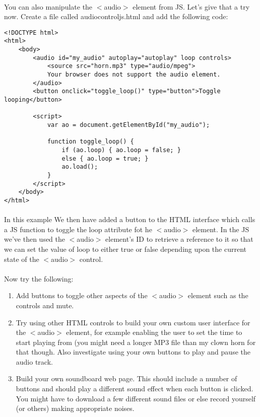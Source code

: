 \documentclass[10pt, a4paper]{article}
\begin{document}
\paragraph{} You can also manipulate the $<$audio$>$ element from JS. Let's give that a try now. Create a file called audiocontroljs.html and add the following code:

\begin{lstlisting}
<!DOCTYPE html>
<html>
    <body>
        <audio id="my_audio" autoplay="autoplay" loop controls>
            <source src="horn.mp3" type="audio/mpeg">
            Your browser does not support the audio element.
        </audio>
        <button onclick="toggle_loop()" type="button">Toggle looping</button>

        <script>
            var ao = document.getElementById("my_audio");

            function toggle_loop() {
                if (ao.loop) { ao.loop = false; }
                else { ao.loop = true; }
                ao.load();
            }
        </script>
    </body>
</html>
\end{lstlisting}

\paragraph{} In this example  We then have added a button to the HTML interface which calls a JS function to toggle the loop attribute fot he $<$audio$>$ element. In the JS we've then used the $<$audio$>$ element's ID to retrieve a reference to it so that we can set the value of loop to either true or false depending upon the current state of the $<$audio$>$ control.

\paragraph{} Now try the following:
\begin{enumerate}
\item Add buttons to toggle other aspects of the $<$audio$>$ element such as the controls and mute.
\item Try using other HTML controls to build your own custom user interface for the $<$audio$>$ element, for example enabling the user to set the time to start playing from (you might need a longer MP3 file than my clown horn for that though. Also investigate using your own buttons to play and pause the audio track.
\item Build your own soundboard web page. This should include a number of buttons and should play a different sound effect when each button is clicked. You might have to download a few different sound files or else record yourself (or others) making appropriate noises. 
\end{enumerate}
\end{document}
